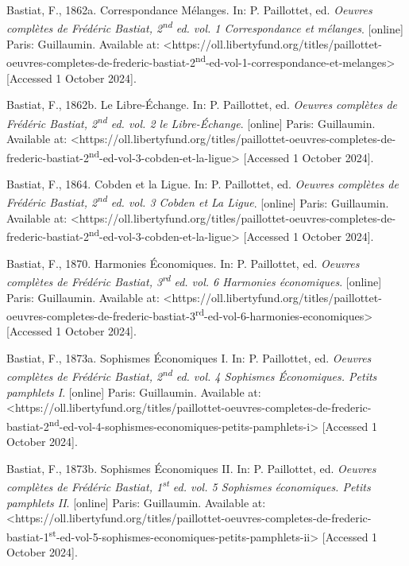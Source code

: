 Bastiat, F., 1862a. Correspondance Mélanges. In: P. Paillottet, ed. \textit{Oeuvres complètes de Frédéric Bastiat, 2\textsuperscript{nd} ed. vol. 1 Correspondance et mélanges}. [online] Paris: Guillaumin. Available at: {\textless}https://oll.libertyfund.org/titles/paillottet-oeuvres-completes-de-frederic-bastiat-2\textsuperscript{nd}-ed-vol-1-correspondance-et-melanges{\textgreater} [Accessed 1 October 2024].



Bastiat, F., 1862b. Le Libre-Échange. In: P. Paillottet, ed. \textit{Oeuvres complètes de Frédéric Bastiat, 2\textsuperscript{nd} ed. vol. 2 le Libre-Échange}. [online] Paris: Guillaumin. Available at: {\textless}https://oll.libertyfund.org/titles/paillottet-oeuvres-completes-de-frederic-bastiat-2\textsuperscript{nd}-ed-vol-3-cobden-et-la-ligue{\textgreater} [Accessed 1 October 2024].



Bastiat, F., 1864. Cobden et la Ligue. In: P. Paillottet, ed. \textit{Oeuvres complètes de Frédéric Bastiat, 2\textsuperscript{nd} ed. vol. 3 Cobden et La Ligue}. [online] Paris: Guillaumin. Available at: {\textless}https://oll.libertyfund.org/titles/paillottet-oeuvres-completes-de-frederic-bastiat-2\textsuperscript{nd}-ed-vol-3-cobden-et-la-ligue{\textgreater} [Accessed 1 October 2024].



Bastiat, F., 1870. Harmonies Économiques. In: P. Paillottet, ed. \textit{Oeuvres complètes de Frédéric Bastiat, 3\textsuperscript{rd} ed. vol. 6 Harmonies économiques}. [online] Paris: Guillaumin. Available at: {\textless}https://oll.libertyfund.org/titles/paillottet-oeuvres-completes-de-frederic-bastiat-3\textsuperscript{rd}-ed-vol-6-harmonies-economiques{\textgreater} [Accessed 1 October 2024].



Bastiat, F., 1873a. Sophismes Économiques I. In: P. Paillottet, ed. \textit{Oeuvres complètes de Frédéric Bastiat, 2\textsuperscript{nd} ed. vol. 4 Sophismes Économiques. Petits pamphlets I}. [online] Paris: Guillaumin. Available at: {\textless}https://oll.libertyfund.org/titles/paillottet-oeuvres-completes-de-frederic-bastiat-2\textsuperscript{nd}-ed-vol-4-sophismes-economiques-petits-pamphlets-i{\textgreater} [Accessed 1 October 2024].



Bastiat, F., 1873b. Sophismes Économiques II. In: P. Paillottet, ed. \textit{Oeuvres complètes de Frédéric Bastiat, 1\textsuperscript{st} ed. vol. 5 Sophismes économiques. Petits pamphlets II}. [online] Paris: Guillaumin. Available at: {\textless}https://oll.libertyfund.org/titles/paillottet-oeuvres-completes-de-frederic-bastiat-1\textsuperscript{st}-ed-vol-5-sophismes-economiques-petits-pamphlets-ii{\textgreater} [Accessed 1 October 2024].



